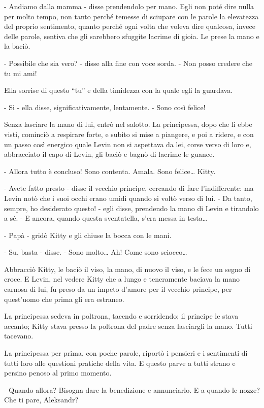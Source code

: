 - Andiamo dalla mamma - disse prendendolo per mano. Egli non poté dire nulla per molto tempo, non tanto perché temesse di sciupare con le parole la elevatezza del proprio sentimento, quanto perché ogni volta che voleva dire qualcosa, invece delle parole, sentiva che gli sarebbero sfuggite lacrime di gioia. Le prese la mano e la baciò. 

- Possibile che sia vero? - disse alla fine con voce sorda. - Non posso credere che tu mi ami! 

Ella sorrise di questo ``tu'' e della timidezza con la quale egli la guardava. 

- Sì - ella disse, significativamente, lentamente. - Sono così felice! 

Senza lasciare la mano di lui, entrò nel salotto. La principessa, dopo che li ebbe visti, cominciò a respirare forte, e subito si mise a piangere, e poi a ridere, e con un passo così energico quale Levin non si aspettava da lei, corse verso di loro e, abbracciato il capo di Levin, gli baciò e bagnò di lacrime le guance. 

- Allora tutto è concluso! Sono contenta. Amala. Sono felice\ldots{} Kitty. 

- Avete fatto presto - disse il vecchio principe, cercando di fare l'indifferente: ma Levin notò che i suoi occhi erano umidi quando si voltò verso di lui. - Da tanto, sempre, ho desiderato questo! - egli disse, prendendo la mano di Levin e tirandolo a sé. - E ancora, quando questa sventatella, s'era messa in testa\ldots{} 

- Papà - gridò Kitty e gli chiuse la bocca con le mani. 

- Su, basta - disse. - Sono molto\ldots{} Ah! Come sono sciocco\ldots{} 

Abbracciò Kitty, le baciò il viso, la mano, di nuovo il viso, e le fece un segno di croce. E Levin, nel vedere Kitty che a lungo e teneramente baciava la mano carnosa di lui, fu preso da un impeto d'amore per il vecchio principe, per quest'uomo che prima gli era estraneo. 

La principessa sedeva in poltrona, tacendo e sorridendo; il principe le stava accanto; Kitty stava presso la poltrona del padre senza lasciargli la mano. Tutti tacevano. 

La principessa per prima, con poche parole, riportò i pensieri e i sentimenti di tutti loro alle questioni pratiche della vita. E questo parve a tutti strano e persino penoso al primo momento. 

- Quando allora? Bisogna dare la benedizione e annunciarlo. E a quando le nozze? Che ti pare, Aleksandr? 

